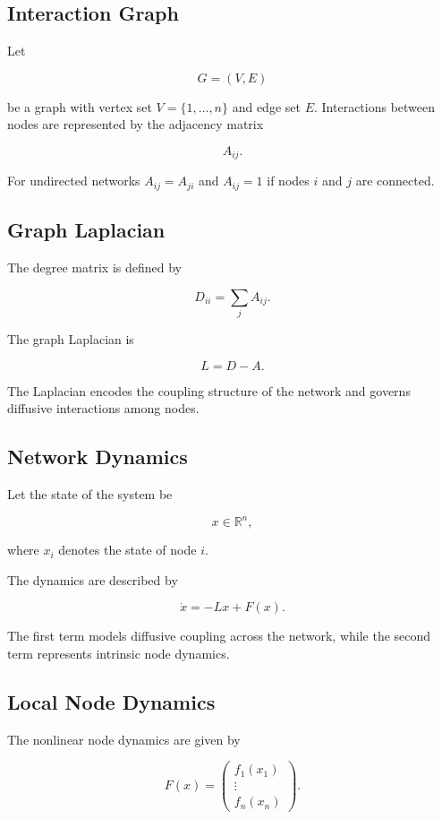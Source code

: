 \documentclass[12pt]{article}
\begin{document}
\subsection{Interaction Graph}

Let

\[
G=(V,E)
\]

be a graph with vertex set $V=\{1,\dots,n\}$ and edge set $E$. Interactions between nodes are represented by the adjacency matrix

\[
A_{ij}.
\]

For undirected networks $A_{ij}=A_{ji}$ and $A_{ij}=1$ if nodes $i$ and $j$ are connected.

\subsection{Graph Laplacian}

The degree matrix is defined by

\[
D_{ii}=\sum_j A_{ij}.
\]

The graph Laplacian is

\[
L=D-A.
\]

The Laplacian encodes the coupling structure of the network and governs diffusive interactions among nodes.

\subsection{Network Dynamics}

Let the state of the system be

\[
x \in \mathbb{R}^n,
\]

where $x_i$ denotes the state of node $i$.

The dynamics are described by

\[
\dot{x} = -Lx + F(x).
\]

The first term models diffusive coupling across the network, while the second term represents intrinsic node dynamics.

\subsection{Local Node Dynamics}

The nonlinear node dynamics are given by

\[
F(x)=
\begin{pmatrix}
f_1(x_1)\\
\vdots\\
f_n(x_n)
\end{pmatrix}.
\]
\end{document}
